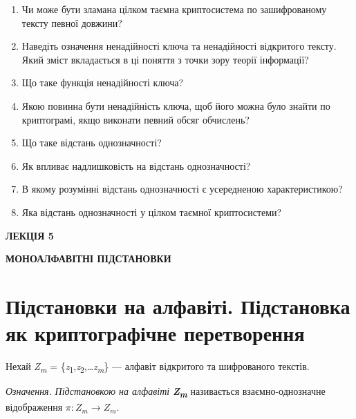 \bigskip


\bigskip

\liststyleWWviiiNumx
\begin{enumerate}
\item Чи може бути зламана цілком таємна криптосистема по зашифрованому тексту
певної довжини?
\item Наведіть означення ненадійності ключа та ненадійності відкритого тексту.
Який зміст вкладається в ці поняття з точки зору теорії інформації?
\item Що таке функція ненадійності ключа?
\item Якою повинна бути ненадійність ключа, щоб його можна було знайти по
криптограмі, якщо виконати певний обсяг обчислень?
\item Що таке відстань однозначності?
\item Як впливає надлишковість на відстань однозначності?
\item В якому розумінні відстань однозначності є усередненою характеристикою?
\item Яка відстань однозначності у цілком таємної криптосистеми? 
\end{enumerate}

\bigskip


\bigskip


\bigskip

{\bfseries
ЛЕКЦІЯ  5}


\bigskip

{\centering\bfseries
МОНОАЛФАВІТНІ  ПІДСТАНОВКИ
\par}


\bigskip


\bigskip

\section{Підстановки на алфавіті. Підстановка як криптографічне перетворення}


\bigskip


\bigskip

Нехай \textit{Z}\textit{\textsubscript{m}} =
\{\textit{z}\textsubscript{1},\textit{z}\textsubscript{2},…\textit{z}\textit{\textsubscript{m}}\}
--- алфавіт відкритого та шифрованого текстів.

\textit{Означення.}\textit{ Підстановкою на алфавіті}\textbf{\textit{
}}\textbf{\textit{Z}}\textbf{\textit{\textsubscript{m}}} називається
взаємно-однозначне відображення  $\pi :Z_m\rightarrow Z_m$.

